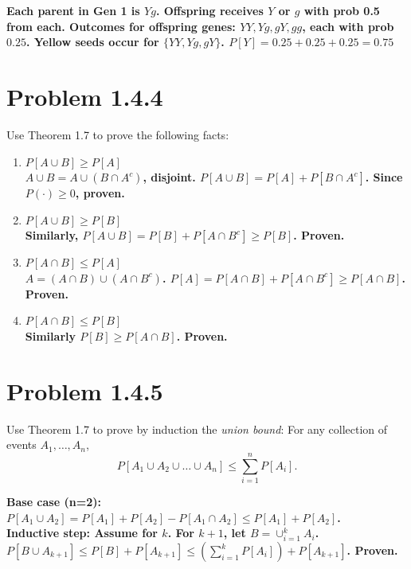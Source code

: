 \documentclass{article}
\begin{document}
\vspace{1em}
{\boldmath\textbf{Each parent in Gen 1 is $Yg$. Offspring receives $Y$ or $g$ with prob 0.5 from each.
Outcomes for offspring genes: $YY, Yg, gY, gg$, each with prob $0.25$.
Yellow seeds occur for $\{YY, Yg, gY\}$.
$P[Y] = 0.25 + 0.25 + 0.25 = 0.75$}}

\newpage

\section*{Problem 1.4.4}
Use Theorem 1.7 to prove the following facts:
\begin{enumerate}[label=(\alph*)]
    \item $P[A \cup B] \ge P[A]$ \\[1em]
    {\boldmath\textbf{$A \cup B = A \cup (B \cap A^c)$, disjoint. $P[A \cup B] = P[A] + P[B \cap A^c]$. Since $P(\cdot) \ge 0$, proven.}}
    
    \item $P[A \cup B] \ge P[B]$ \\[1em]
    {\boldmath\textbf{Similarly, $P[A \cup B] = P[B] + P[A \cap B^c] \ge P[B]$. Proven.}}
    
    \item $P[A \cap B] \le P[A]$ \\[1em]
    {\boldmath\textbf{$A = (A \cap B) \cup (A \cap B^c)$. $P[A] = P[A \cap B] + P[A \cap B^c] \ge P[A \cap B]$. Proven.}}
    
    \item $P[A \cap B] \le P[B]$ \\[1em]
    {\boldmath\textbf{Similarly $P[B] \ge P[A \cap B]$. Proven.}}
\end{enumerate}

\newpage

\section*{Problem 1.4.5}
Use Theorem 1.7 to prove by induction the \textit{union bound}: For any collection of events $A_1, \dots, A_n$,
\[ P[A_1 \cup A_2 \cup \dots \cup A_n] \le \sum_{i=1}^n P[A_i]. \]

\noindent \vspace{1em} {\boldmath\textbf{Base case (n=2): $P[A_1 \cup A_2] = P[A_1] + P[A_2] - P[A_1 \cap A_2] \le P[A_1] + P[A_2]$.}} \\
{\boldmath\textbf{Inductive step: Assume for $k$. For $k+1$, let $B = \cup_{i=1}^k A_i$. \\
$P[B \cup A_{k+1}] \le P[B] + P[A_{k+1}] \le (\sum_{i=1}^k P[A_i]) + P[A_{k+1}]$. Proven.}}
\end{document}
